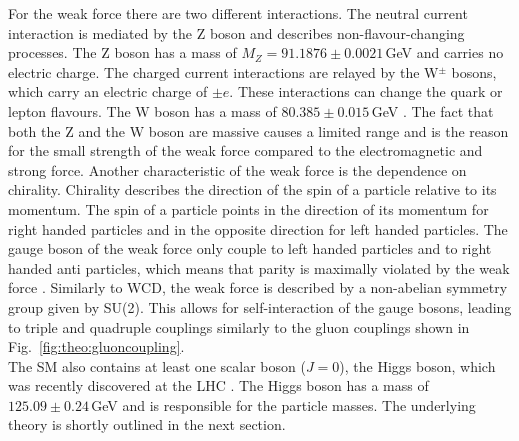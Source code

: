\noindent For the weak force there are two different interactions. The neutral current interaction is mediated by the Z boson and describes non-flavour-changing processes. The Z boson has a mass of $M_Z=91.1876 \pm 0.0021$\,GeV \cite{SMmasses} and carries no electric charge. The charged current interactions are relayed by the W$^\pm$ bosons, which carry an electric charge of $\pm e$. These interactions can change the quark or lepton flavours. The W boson has a mass of $80.385 \pm 0.015$\,GeV \cite{SMmasses}. The fact that both the Z and the W boson are massive causes a limited range and is the reason for the small strength of the weak force compared to the electromagnetic and strong force. Another characteristic of the weak force is the dependence on chirality. Chirality describes the direction of the spin of a particle relative to its momentum. The spin of a particle points in the direction of its momentum for right handed particles and in the opposite direction for left handed particles. The gauge boson of the weak force only couple to left handed particles and to right handed anti particles, which means that parity is maximally violated by the weak force \cite{wu}. Similarly to WCD, the weak force is described by a non-abelian symmetry group given by SU(2). This allows for self-interaction of the gauge bosons, leading to triple and quadruple couplings similarly to the gluon couplings shown in Fig.~\ref{fig:theo:gluoncoupling}.\\

\noindent The SM also contains at least one scalar boson ($J=0$), the Higgs boson, which was recently discovered at the LHC \cite{cms_higgsdiscov,atlas_higgsdiscov}. The Higgs boson has a mass of $125.09 \pm 0.24$\,GeV and is responsible for the particle masses. The underlying theory is shortly outlined in the next section.\\

